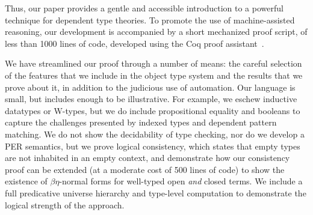 \documentclass[acmsmall,screen=true,
\ifpublic review=false\else,review=true\fi
  ,anonymous=\ifanonymous true\else false\fi]{acmart}
\newcommand{\lang}{$\lambda^{U\mathbb{B}\ottkw{Id}}$\xspace}
\begin{document}
Thus, our paper provides a gentle and accessible introduction to a powerful
technique for dependent type theories. To promote the use of machine-assisted
reasoning, our development is accompanied by a short mechanized proof script,
of less than 1000 lines of code, developed using the Coq proof
assistant~\cite{coq}.

We have streamlined our proof through a number of means: the careful selection
of the features that we include in the object type system and the results that
we prove about it, in addition to the judicious use of automation.  Our
language is small, but includes enough to be illustrative. For example, we
eschew inductive datatypes or W-types, but we do include propositional
equality and booleans to capture the challenges presented by indexed types and
dependent pattern matching. We do not show the decidability of type checking,
nor do we develop a PER semantics, but we prove logical consistency, which
states that empty types are not inhabited in an empty context, and demonstrate
how our consistency proof can be extended (at a moderate cost of 500 lines of
code) to show the existence of $\beta\eta$-normal forms for well-typed open
\emph{and} closed terms. We include a full predicative universe hierarchy and
type-level computation to demonstrate the logical strength of the approach.

\end{document}
